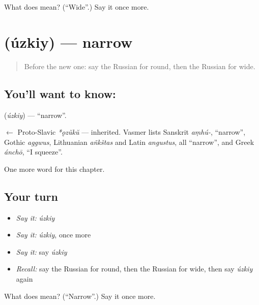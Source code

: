 \begin{tcolorbox}[breakable,colback=teal!4,colframe=teal!35!black,title={Before you move on}]
What does  mean? (\textquotedblleft{}Wide\textquotedblright{}.) Say it once more.
\end{tcolorbox}
\section[\texorpdfstring{\ru{узкий} (úzkiy)}{узкий (úzkiy)}]{ (úzkiy) — narrow}

\label{lesson:RU-C129-narrow}



\begin{quote}
Before the new one: say the Russian for round, then the Russian for wide.
\end{quote}

\subsection*{You'll want to know: }
\textbf{} (\emph{úzkiy}) — \textquotedblleft{}narrow\textquotedblright{}.

\begin{cousinweb}
\textbf{} $\leftarrow$ Proto-Slavic \emph{*ǫzŭkŭ} — inherited. Vasmer lists Sanskrit \emph{aṃhú-}, \textquotedblleft{}narrow\textquotedblright{}, Gothic \emph{aggwus}, Lithuanian \emph{añkštas} and Latin \emph{angustus}, all \textquotedblleft{}narrow\textquotedblright{}, and Greek \emph{ánchō}, \textquotedblleft{}I squeeze\textquotedblright{}.
\end{cousinweb}

\begin{grammarlens}[title={What you've built}]
One more word for this chapter.
\end{grammarlens}

\subsection*{Your turn}
\begin{itemize}
\raggedright
  \item \emph{Say it:} \emph{úzkiy}
  \item \emph{Say it:} \emph{úzkiy}, once more
  \item \emph{Say it:} say \emph{úzkiy}
  \item \emph{Recall:} say the Russian for round, then the Russian for wide, then say \emph{úzkiy} again
\end{itemize}

\begin{tcolorbox}[breakable,colback=teal!4,colframe=teal!35!black,title={Before you move on}]
What does  mean? (\textquotedblleft{}Narrow\textquotedblright{}.) Say it once more.
\end{tcolorbox}

